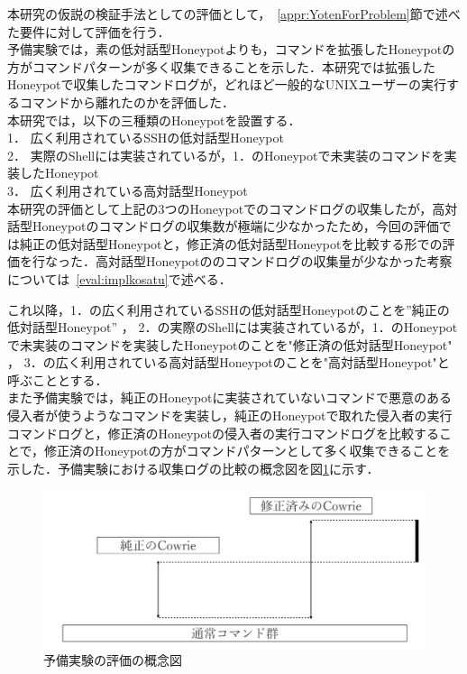 本研究の仮説の検証手法としての評価として，~\ref{appr:YotenForProblem}節で述べた要件に対して評価を行う．\\
予備実験では，素の低対話型Honeypotよりも，コマンドを拡張したHoneypotの方がコマンドパターンが多く収集できることを示した．本研究では拡張したHoneypotで収集したコマンドログが，どれほど一般的なUNIXユーザーの実行するコマンド\cite{unixdata}から離れたのかを評価した．\\
本研究では，以下の三種類のHoneypotを設置する．\\
1． 広く利用されているSSHの低対話型Honeypot\\
2． 実際のShellには実装されているが，1．のHoneypotで未実装のコマンドを実装したHoneypot\\
3． 広く利用されている高対話型Honeypot\\
本研究の評価として上記の3つのHoneypotでのコマンドログの収集したが，高対話型Honeypotのコマンドログの収集数が極端に少なかったため，今回の評価では純正の低対話型Honeypotと，修正済の低対話型Honeypotを比較する形での評価を行なった．高対話型Honeypotののコマンドログの収集量が少なかった考察については~\ref{eval:implkosatu}で述べる．

これ以降，1．の広く利用されているSSHの低対話型Honeypotのことを”純正の低対話型Honeypot” ， 2．の実際のShellには実装されているが，1．のHoneypotで未実装のコマンドを実装したHoneypotのことを"修正済の低対話型Honeypot" ， 3．の広く利用されている高対話型Honeypotのことを"高対話型Honeypot"と呼ぶこととする．\\


また予備実験では，純正のHoneypotに実装されていないコマンドで悪意のある侵入者が使うようなコマンドを実装し，純正のHoneypotで取れた侵入者の実行コマンドログと，修正済のHoneypotの侵入者の実行コマンドログを比較することで，修正済のHoneypotの方がコマンドパターンとして多く収集できることを示した．予備実験における収集ログの比較の概念図を図\ref{fig:yobigainen}に示す．

\begin{figure}[htbp]
    \centering
    \includegraphics[width=1.0\textwidth]{figures/termhyoka.png}
    \caption{予備実験の評価の概念図}
    \label{fig:yobigainen}
\end{figure}

